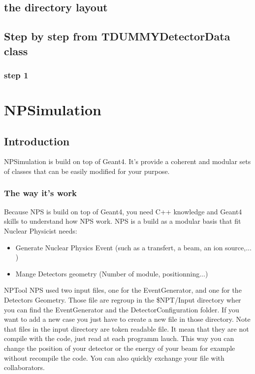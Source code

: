\documentclass{book}
\begin{document}
	\section{the directory layout}
	
	\section{Step by step from TDUMMYDetectorData class}
		\subsection{step 1}
				
\chapter[NPSimulation]{NPSimulation}

\section{Introduction}

NPSimulation is build on top of Geant4. 
It's provide a coherent and modular sets of classes that can be easily modified for your purpose.

\subsection{ The way it's work }

Because NPS is build on top of Geant4, you need C++ knowledge and Geant4 skills to understand how NPS work. 
NPS is a build as a modular basis that fit Nuclear Physicist needs: 
	\begin{itemize}
		\item Generate Nuclear Physics Event (such as a transfert, a beam, an ion source,... ) 
		\item Mange Detectors geometry (Number of module, positionning...)
	\end{itemize}
NPTool
NPS used two input files, one for the EventGenerator, and one for the Detectors Geometry. 
Those file are regroup in the \$NPT/Input directory wher you can find the EventGenerator and the DetectorConfiguration folder. 
If you want to add a new case you just have to create a new file in those directory. 
Note that files in the input directory are token readable file. It mean that they are not compile with the code, just read at each programm lauch. 
This way you can change the position of your detector or the energy of your beam for example without recompile the code. 
You can also quickly exchange your file with collaborators.
\end{document}
